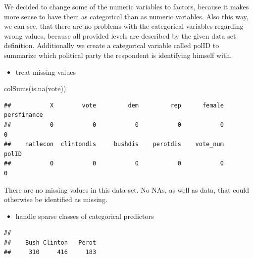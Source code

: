 \documentclass[
]{article}
\newenvironment{Shaded}{\begin{snugshade}}{\end{snugshade}}
\newcommand{\CommentTok}[1]{\textcolor[rgb]{0.56,0.35,0.01}{\textit{#1}}}
\newcommand{\FunctionTok}[1]{\textcolor[rgb]{0.00,0.00,0.00}{#1}}
\newcommand{\NormalTok}[1]{#1}
\newcommand{\SpecialCharTok}[1]{\textcolor[rgb]{0.00,0.00,0.00}{#1}}
\providecommand{\tightlist}{%
  \setlength{\itemsep}{0pt}\setlength{\parskip}{0pt}}
\begin{document}
We decided to change some of the numeric variables to factors, because
it makes more sense to have them as categorical than as numeric
variables. Also this way, we can see, that there are no problems with
the categorical variables regarding wrong values, because all provided
levels are described by the given data set definition. Additionally we
create a categorical variable called polID to summarize which political
party the respondent is identifying himself with.

\begin{itemize}
\tightlist
\item
  treat missing values
\end{itemize}

\begin{Shaded}
\begin{Highlighting}[]
\FunctionTok{colSums}\NormalTok{(}\FunctionTok{is.na}\NormalTok{(vote))}
\end{Highlighting}
\end{Shaded}

\begin{verbatim}
##           X        vote         dem         rep      female persfinance 
##           0           0           0           0           0           0 
##    natlecon  clintondis     bushdis    perotdis    vote_num       polID 
##           0           0           0           0           0           0
\end{verbatim}

There are no missing values in this data set. No NAs, as well as data,
that could otherwise be identified as missing.

\begin{itemize}
\tightlist
\item
  handle sparse classes of categorical predictors
\end{itemize}

\begin{Shaded}
\end{Shaded}

\begin{verbatim}
## 
##    Bush Clinton   Perot 
##     310     416     183
\end{verbatim}

\begin{Shaded}
\end{Shaded}
\end{document}
